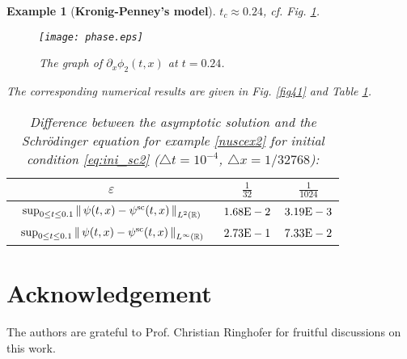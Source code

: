 \documentclass[leqno,final]{siamltex}
\makeatletter
\newtheorem{example}{Example}[section]
{\catcode `\@=11 \global\let\AddToReset=\@addtoreset}
\numberwithin{equation}{section}
\newcounter{me}
\makeatother
\begin{document}
\begin{example}[\textbf{Kronig-Penney's model}]
$t_c\approx 0.24$, {{\sl cf.\/ }} Fig. \ref{phase_caustic}.
\begin{figure} 
\begin{center}\footnotesize
\resizebox{2in}{!} {\texttt{[image: phase.eps]}}
\end{center}
\caption{The graph of $\partial_x\phi_2(t,x)$ at
$t=0.24$.}\label{phase_caustic}
\end{figure}
The corresponding numerical results are given in Fig. \ref{fig41}
and Table \ref{tb03}.
\begin{table}[htbp]
\caption{Difference between the asymptotic solution and the
Schr\"odinger equation for example \ref{nuscex2}  for initial
condition \eqref{eq:ini_sc2} (${\triangle} t=10^{-4}$, ${\triangle}
x=1/32768$):}\label{tb03}
\begin{center}\footnotesize

\begin{tabular}{ccc}\hline
${{\varepsilon }}$ &         ${\frac{{1}}{{32}}}$ & ${\frac{{1}}{{1024}}}$ \\ \hline 
$\begin{array}{c}\vspace{-4mm}\\ {\displaystyle}\sup_{0\le t\le 0.1}\left\|\, \psi
(t,x) - \psi^{\rm sc} (t,x) \, \right\|_{L^{2}({{\mathbb R}})}\end{array}$ &
$1.68{\rm{E}}-2$ & $3.19{\rm{E}}-3$ \vspace*{0.5mm}\\ \hline
$\begin{array}{c}\vspace{-4mm}\\ {\displaystyle}\sup_{0\le t\le 0.1}\left\|\, \psi
(t,x) - \psi^{\rm sc} (t,x) \, \right\|_{L^{\infty}({{\mathbb R}})}\end{array}$ &
$2.73{\rm{E}}-1$ & $7.33{\rm{E}}-2$ \vspace*{0.5mm}\\ \hline
\end{tabular}
\end{center}
\end{table}
\end{example}

\section{Acknowledgement}\label{ACK}
The authors are grateful to Prof. Christian Ringhofer for fruitful
discussions on this work.
\end{document}
